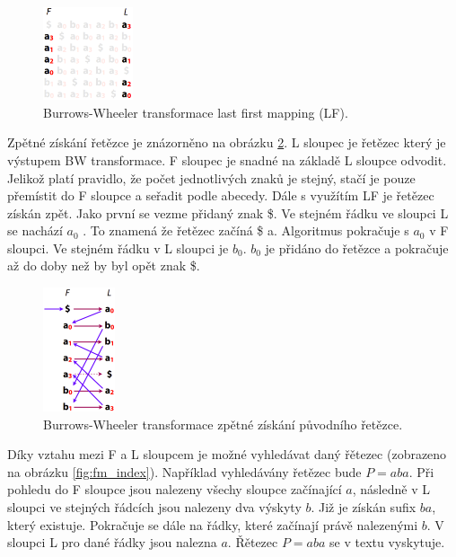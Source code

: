 \documentclass[czech,DP]{thesiskiv}
\numberwithin{equation}{section}
\begin{document}
\begin{figure}[H]		
		\centering
		\includegraphics[width=100px]{./img/BWT_2.png}
		\caption{Burrows-Wheeler transformace last first mapping (LF). \cite{bw_transform}}
		\label{fig:bw_transform_lf}
\end{figure}

\noindent
Zpětné získání řetězce je znázorněno na obrázku \ref{fig:bw_transform_inverse}. L sloupec je řetězec který je výstupem BW transformace. F sloupec je snadné na základě L sloupce odvodit. Jelikož platí pravidlo, že počet jednotlivých znaků je stejný, stačí je pouze přemístit do F sloupce a seřadit podle abecedy. Dále s využítím LF je řetězec získán zpět. Jako první se vezme přidaný znak \$. Ve stejném řádku ve sloupci L se nachází $a_0$ . To znamená že řetězec začíná \$ a. Algoritmus pokračuje s $a_0$ v F sloupci. Ve stejném řádku v L sloupci je $b_0$. $b_0$ je přidáno do řetězce a pokračuje až do doby než by byl opět znak \$. 


\begin{figure}[H]		
		\centering
		\includegraphics[width=80px]{./img/BWT_3.png}
		\caption{Burrows-Wheeler transformace zpětné získání původního řetězce. \cite{bw_transform}}
		\label{fig:bw_transform_inverse}
\end{figure}

\noindent
Díky vztahu mezi F a L sloupcem je možné vyhledávat daný řětezec (zobrazeno na obrázku \ref{fig:fm_index}). Například vyhledávány řetězec bude $P = aba$. Při pohledu do F sloupce jsou nalezeny všechy sloupce začínající $a$, následně v L sloupci ve stejných řádcích jsou nalezeny dva výskyty $b$. Již je získán sufix $ba$, který existuje. Pokračuje se dále na řádky, které začínají právě nalezenými $b$. V sloupci L pro dané řádky jsou nalezna $a$. Řětezec $P = aba$ se v textu vyskytuje. 
\end{document}

